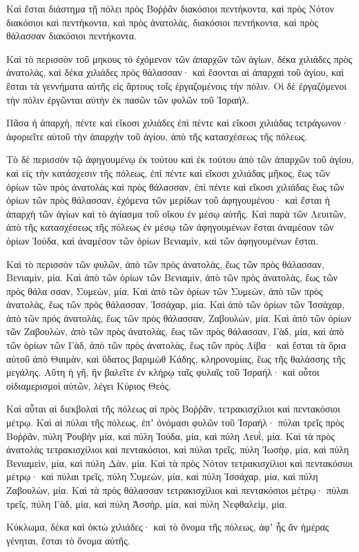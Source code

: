 {Καὶ ἔσται διάστημα τῇ πόλει πρὸς Βοῤῥᾶν διακόσιοι πεντήκοντα, καὶ πρὸς Νότον διακόσιοι καὶ πεντήκοντα, καὶ πρὸς ἀνατολὰς, διακόσιοι πεντήκοντα, καὶ πρὸς θάλασσαν διακόσιοι πεντήκοντα.
\par }{\PP {}Καὶ τὸ περισσὸν τοῦ μηκους τὸ ἐχόμενον τῶν ἀπαρχῶν τῶν ἁγίων, δέκα χιλιάδες πρὸς ἀνατολὰς, καὶ δέκα χιλιάδες πρὸς θάλασσαν· καὶ ἔσονται αἱ ἀπαρχαὶ τοῦ ἁγίου, καὶ ἔσται τὰ γεννήματα αὐτῆς εἰς ἄρτους τοῖς ἐργαζομένοις τὴν πόλιν.
Οἱ δὲ ἐργαζόμενοι τὴν πόλιν ἐργῶνται αὐτὴν ἐκ πασῶν τῶν φυλῶν τοῦ Ἰσραήλ.
\par }{\PP {}Πᾶσα ἡ ἀπαρχὴ, πέντε καὶ εἴκοσι χιλιάδες ἐπὶ πέντε καὶ εἴκοσι χιλιάδας τετράγωνον· ἀφοριεῖτε αὐτοῦ τὴν ἀπαρχὴν τοῦ ἁγίου, ἀπὸ τῆς κατασχέσεως τῆς πόλεως.
\par }{\PP {}Τὸ δὲ περισσὸν τῷ ἀφηγουμένῳ ἐκ τούτου καὶ ἐκ τούτου ἀπὸ τῶν ἀπαρχῶν τοῦ ἁγίου, καὶ εἰς τὴν κατάσχεσιν τῆς πόλεως, ἐπὶ πέντε καὶ εἴκοσι χιλιάδας μῆκος, ἕως τῶν ὁρίων τῶν πρὸς ἀνατολὰς καὶ πρὸς θάλασσαν, ἐπὶ πέντε καὶ εἴκοσι χιλιάδας ἕως τῶν ὁρίων τῶν πρὸς θάλασσαν, ἐχόμενα τῶν μερίδων τοῦ ἀφηγουμένου· καὶ ἔσται ἡ ἀπαρχὴ τῶν ἁγίων καὶ τὸ ἁγίασμα τοῦ οἴκου ἐν μέσῳ αὐτῆς.
Καὶ παρὰ τῶν Λευιτῶν, ἀπὸ τῆς κατασχέσεως τῆς πόλεως ἐν μέσῳ τῶν ἀφηγουμένων ἔσται ἀναμέσον τῶν ὁρίων Ἰούδα, καὶ ἀναμέσον τῶν ὁρίων Βενιαμὶν, καὶ τῶν ἀφηγουμένων ἔσται.
\par }{\PP {}Καὶ τὸ περισσὸν τῶν φυλῶν, ἀπὸ τῶν πρὸς ἀνατολὰς, ἕως τῶν πρὸς θάλασσαν, Βενιαμὶν, μία.
Καὶ ἀπὸ τῶν ὁρίων τῶν Βενιαμὶν, ἀπὸ τῶν πρὸς ἀνατολὰς, ἕως τῶν πρὸς θάλα σσαν, Συμεὼν, μία.
Καὶ ἀπὸ τῶν ὁρίων τῶν Συμεὼν, ἀπὸ τῶν πρὸς ἀνατολὰς, ἕως τῶν πρὸς θάλασσαν, Ἰσσάχαρ, μία.
Καὶ ἀπὸ τῶν ὁρίων τῶν Ἰσσάχαρ, ἀπὸ τῶν πρὸς ἀνατολὰς, ἕως τῶν πρὸς θάλασσαν, Ζαβουλὼν, μία.
Καὶ ἀπὸ τῶν ὁρίων τῶν Ζαβουλὼν, ἀπὸ τῶν πρὸς ἀνατολὰς, ἕως τῶν πρὸς θάλασσαν, Γὰδ, μία,
καὶ ἀπὸ τῶν ὁρίων τῶν Γὰδ, ἀπὸ τῶν πρὸς ἀνατολὰς, ἕως τῶν πρὸς Λίβα· καὶ ἔσται τὰ ὅρια αὐτοῦ ἀπὸ Θαιμὰν, καὶ ὕδατος βαριμὼθ Κάδης, κληρονομίας, ἕως τῆς θαλάσσης τῆς μεγάλης.
Αὕτη ἡ γῆ, ἣν βαλεῖτε ἐν κλήρῳ ταῖς φυλαῖς τοῦ Ἰσραήλ· καὶ οὗτοι οἱδιαμερισμοὶ αὐτῶν, λέγει Κύριος Θεός.
\par }{\PP {}Καὶ αὗται αἱ διεκβολαὶ τῆς πόλεως αἱ πρὸς Βοῤῥᾶν, τετρακισχίλιοι καὶ πεντακόσιοι μέτρῳ.
Καὶ αἱ πύλαι τῆς πόλεως, ἐπʼ ὀνόμασι φυλῶν τοῦ Ἰσραήλ· πύλαι τρεῖς πρὸς Βοῤῥᾶν, πύλη Ῥουβὴν μία, καὶ πύλη Ἰούδα, μία, καὶ πύλη Λευῒ, μία.
Καὶ τὰ πρὸς ἀνατολὰς τετρακισχίλιοι καὶ πεντακόσιοι, καὶ πύλαι τρεῖς, πύλη Ἰωσὴφ, μία, καὶ πύλη Βενιαμεὶν, μία, καὶ πύλη Δὰν, μία.
Καὶ τὰ πρὸς Νότον τετρακισχίλιοι καὶ πεντακόσιοι μέτρῳ· καὶ πύλαι τρεῖς, πύλη Συμεὼν, μία, καὶ πύλη Ἰσσάχαρ, μία, καὶ πύλη Ζαβουλὼν, μία.
Καὶ τὰ πρὸς θάλασσαν τετρακισχίλιοι καὶ πεντακόσιοι μέτρῳ· πύλαι τρεῖς, πύλη Γὰδ, μία, καὶ πύλη Ἀσσὴρ, μία, καὶ πύλη Νεφθαλεὶμ, μία.
\par }{\PP {}Κύκλωμα, δέκα καὶ ὀκτὼ χιλιάδες· καὶ τὸ ὄνομα τῆς πόλεως, ἀφʼ ἧς ἂν ἡμέρας γένηται, ἔσται τὸ ὄνομα αὐτῆς.
\par }